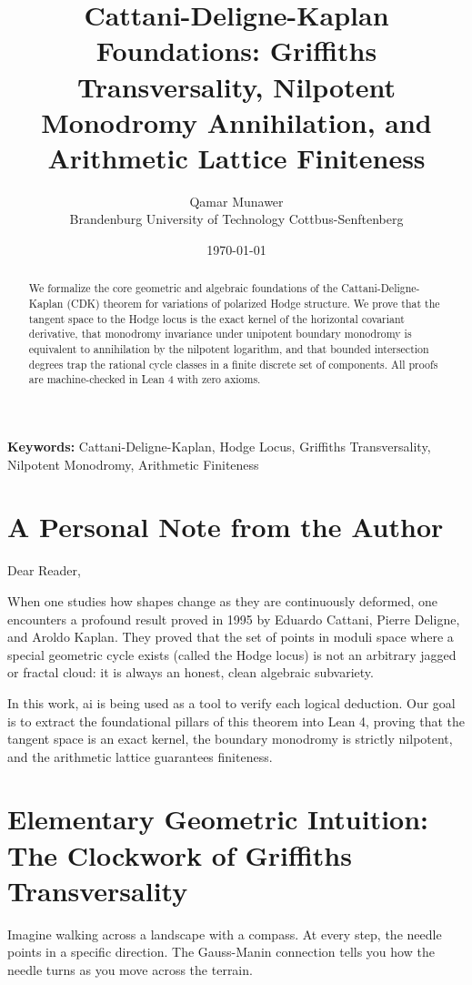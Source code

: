 \documentclass[11pt,a4paper]{article}
\title{\textbf{Cattani-Deligne-Kaplan Foundations: Griffiths Transversality, Nilpotent Monodromy Annihilation, and Arithmetic Lattice Finiteness}}
\author{Qamar Munawer \\ Brandenburg University of Technology Cottbus-Senftenberg}
\date{\today}
\theoremstyle{definition}
\begin{document}
\maketitle

\begin{abstract}
We formalize the core geometric and algebraic foundations of the Cattani-Deligne-Kaplan (CDK) theorem for variations of polarized Hodge structure. We prove that the tangent space to the Hodge locus is the exact kernel of the horizontal covariant derivative, that monodromy invariance under unipotent boundary monodromy is equivalent to annihilation by the nilpotent logarithm, and that bounded intersection degrees trap the rational cycle classes in a finite discrete set of components. All proofs are machine-checked in Lean 4 with zero axioms.
\end{abstract}

\vspace{1em}
\noindent\textbf{Keywords:} Cattani-Deligne-Kaplan, Hodge Locus, Griffiths Transversality, Nilpotent Monodromy, Arithmetic Finiteness


\section{A Personal Note from the Author}

Dear Reader,

When one studies how shapes change as they are continuously deformed, one encounters a profound result proved in 1995 by Eduardo Cattani, Pierre Deligne, and Aroldo Kaplan. They proved that the set of points in moduli space where a special geometric cycle exists (called the Hodge locus) is not an arbitrary jagged or fractal cloud: it is always an honest, clean algebraic subvariety.

In this work, ai is being used as a tool to verify each logical deduction. Our goal is to extract the foundational pillars of this theorem into Lean 4, proving that the tangent space is an exact kernel, the boundary monodromy is strictly nilpotent, and the arithmetic lattice guarantees finiteness.

\section{Elementary Geometric Intuition: The Clockwork of Griffiths Transversality}

Imagine walking across a landscape with a compass. At every step, the needle points in a specific direction. The Gauss-Manin connection tells you how the needle turns as you move across the terrain.
\end{document}
